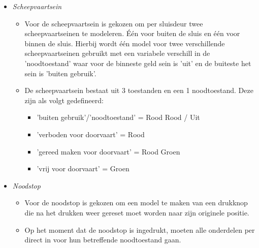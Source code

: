 \documentclass{article}
\begin{document}
\begin{itemize}
        \item \textit{Scheepvaartsein}
        \begin{itemize}
            \item Voor de scheepvaartsein is gekozen om per sluisdeur twee scheepvaartseinen 
            te modeleren. Één voor buiten de sluis en één voor binnen de sluis. Hierbij wordt 
            één model voor twee verschillende scheepvaartseinen gebruikt met een variabele
            verschill in de 'noodtoestand' waar voor de binneste geld sein is 'uit' en de 
            buiteste het sein is 'buiten gebruik'. 
            \item De scheepvaartsein bestaat uit 3 toestanden en een 1 noodtoestand. Deze zijn
            als volgt gedefineerd:
                \begin{itemize}
                    \item 'buiten gebruik'/'noodtoestand' = Rood Rood / Uit
                    \item 'verboden voor doorvaart' = Rood
                    \item 'gereed maken voor doorvaart' = Rood Groen
                    \item 'vrij voor doorvaart' = Groen
                \end{itemize}
        \end{itemize}

        \item \textit{Noodstop}
        \begin{itemize}
            \item Voor de noodstop is gekozen om een model te maken van een drukknop die 
            na het drukken weer gereset moet worden naar zijn originele positie.
            \item Op het moment dat de noodstop is ingedrukt, moeten alle onderdelen per 
            direct in voor hun betreffende noodtoestand gaan.
        \end{itemize}


\end{itemize}
\end{document}
